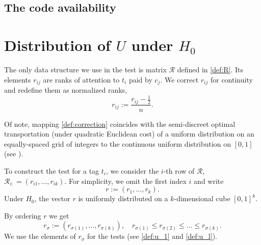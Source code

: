 \documentclass{llncs}
\begin{document}
\subsection{The code availability}













\section{Distribution of $U$ under $H_0$}
\label{sec:theory}
The only data structure we use in the test is matrix $\mathcal{R}$ defined in \eqref{def:R}.  
Its elements $r_{ij}$ are ranks of attention to $t_i$ paid by $c_j$.
We correct $r_{ij}$ for continuity and redefine them as normalized ranks,
\begin{equation}
\label{def:correction}
r_{ij} := \frac{r_{ij} - \frac{1}{2}}{n}.
\end{equation}

Of note, mapping \eqref{def:correction} coincides with the semi-discreet optimal transportation (under quadratic Euclidean cost) of a uniform distribution on an equally-spaced grid of integers to the continuous uniform distribution on $[0, 1]$ (see \cite{Solomon2018OptimalTO}).

To construct the test for a tag $t_i$, we consider the $i$-th row of $\mathcal{R}$, $\mathcal{R}_{i:} = (r_{i1}, \dots, r_{ik})$. For simplicity, we omit the first index $i$ and write
\[
r := (r_{1}, \dots, r_{k}).
\]
Under $H_0$, the vector $r$ is uniformly distributed on a $k$-dimensional cube $[0, 1]^{k}$.

By ordering $r$ we get
\[
r_{\sigma} := (r_{\sigma(1)}, \dots, r_{\sigma(k)}), 
\quad
r_{\sigma(1)} \leq r_{\sigma(2)} \leq \dots \leq r_{\sigma(k)}.
\]
We use the elements of $r_{\sigma}$ for the tests (see \eqref{def:u_1} and \eqref{def:u_l}).
\end{document}
